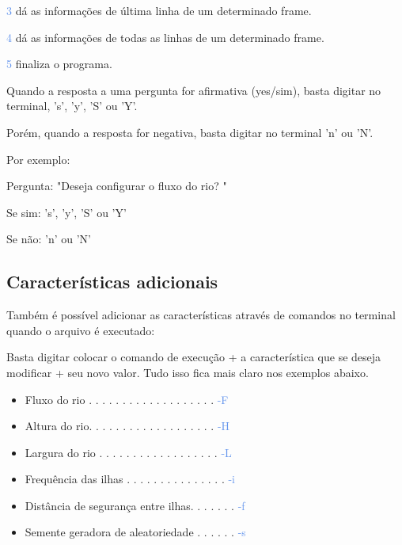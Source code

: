 \documentclass[a4paper,12pt]{article}
\begin{document}
  \textcolor{CornflowerBlue}{3} dá as informações de última linha de um 
  determinado frame.
  
  \textcolor{CornflowerBlue}{4} dá as informações de todas as linhas de um 
  determinado frame.
  
  \textcolor{CornflowerBlue}{5} finaliza o programa.
  
  \bigskip  

  Quando a resposta a uma pergunta for afirmativa (yes/sim), basta digitar no 
  terminal, 's', 'y', 'S' ou 'Y'.
  
  Porém, quando a resposta for negativa, basta digitar no terminal 'n' ou 'N'.
  \bigskip
  \bigskip  

  Por exemplo:
  
  Pergunta: "\textcolor{NavyBlue}{Deseja configurar o fluxo do rio? }"
  
  Se sim:   '\textcolor{NavyBlue}{s}', '\textcolor{NavyBlue}{y}',
  '\textcolor{NavyBlue}{S}' ou '\textcolor{NavyBlue}{Y}'
  
  Se não:   '\textcolor{NavyBlue}{n}' ou '\textcolor{NavyBlue}{N}'


\newpage %


  \bigskip
  \subsection{\textcolor{NavyBlue}{Características adicionais}}
  
  Também é possível adicionar as características através de comandos no terminal 
  quando o arquivo é executado:
  
  Basta digitar colocar o comando de execução + a característica que se deseja 
  modificar + seu novo valor. Tudo isso fica mais claro nos exemplos abaixo.
  
  \bigskip
  \begin{itemize}
  
  \item Fluxo do rio . . . . . . . . . . . . . . . . . . .  \textcolor{CornflowerBlue}{-F}
  \item Altura do rio. . . . . . . . . . . . . . . . . . .  \textcolor{CornflowerBlue}{-H}
  \item Largura do rio . . . . . . . . . . . . . . . . . .  \textcolor{CornflowerBlue}{-L}
  \item Frequência das ilhas . . . . . . . . . . . . . . .  \textcolor{CornflowerBlue}{-i} 
  \item Distância de segurança entre ilhas. . . . . . .  \textcolor{CornflowerBlue}{-f}
  \item Semente geradora de aleatoriedade . . . . . .  \textcolor{CornflowerBlue}{-s}
  
  \end{itemize}
  \bigskip
  
\end{document}
